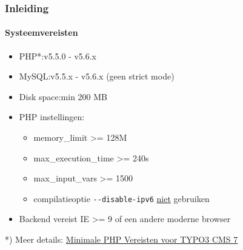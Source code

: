 %
\begin{frame}[fragile]
	\frametitle{Inleiding}
	\framesubtitle{Systeemvereisten}

	\begin{itemize}
		\item PHP*:\tabto{2.2cm}v5.5.0 - v5.6.x
		\item MySQL:\tabto{2.2cm}v5.5.x - v5.6.x (geen strict mode)
		\item Disk space:\tabto{2.2cm}min 200 MB
		\item PHP instellingen:

			\begin{itemize}
				\item memory\_limit >= 128M
				\item max\_execution\_time >= 240s
				\item max\_input\_vars >= 1500
				\item compilatieoptie \texttt{-}\texttt{-disable-ipv6} \underline{niet} gebruiken
			\end{itemize}

		\item Backend vereist IE >= 9 of een andere moderne browser

	\end{itemize}

	\vspace{0.8cm}

	*) Meer details: \href{http://typo3.org/news/article/php-minimum-requirements-for-typo3-cms-7/}{Minimale PHP Vereisten voor TYPO3 CMS 7}

\end{frame}

